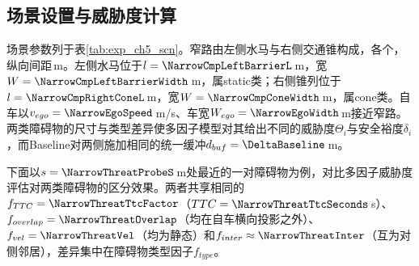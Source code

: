 \subsection{场景设置与威胁度计算}

场景参数列于表\ref{tab:exp_ch5_scn}。窄路由左侧水马与右侧交通锥构成，各\NarrowCmpObsCountPerSide 个，纵向间距\NarrowCmpLongitudinalSpacing\,m。左侧水马位于$l=\NarrowCmpLeftBarrierL$\,m，宽$W=\NarrowCmpLeftBarrierWidth$\,m，属static类；右侧锥列位于$l=\NarrowCmpRightConeL$\,m，宽$W=\NarrowCmpConeWidth$\,m，属cone类。自车以$v_{ego}=\NarrowEgoSpeed$\,m/s、车宽$W_{ego}=\NarrowEgoWidth$\,m接近窄路。两类障碍物的尺寸与类型差异使多因子模型对其给出不同的威胁度$\Theta_i$与安全裕度$\delta_i$，而Baseline对两侧施加相同的统一缓冲$d_{buf}=\DeltaBaseline$\,m。

\begin{table}[htbp]
\centering
\caption{场景一混合障碍物窄路参数配置}
\label{tab:exp_ch5_scn}
\small
{}
\end{table}

下面以$s=\NarrowThreatProbeS$\,m处最近的一对障碍物为例，对比多因子威胁度评估对两类障碍物的区分效果。两者共享相同的$f_{TTC}=\NarrowThreatTtcFactor$（$TTC=\NarrowThreatTtcSeconds$\,s）、$f_{overlap}=\NarrowThreatOverlap$（均在自车横向投影之外）、$f_{vel}=\NarrowThreatVel$（均为静态）和$f_{inter}\approx\NarrowThreatInter$（互为对侧邻居），差异集中在障碍物类型因子$f_{type}$。

